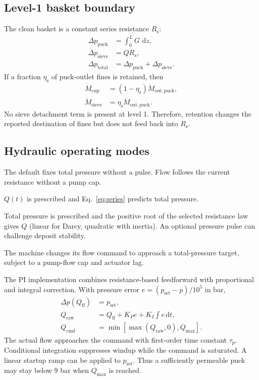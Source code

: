 \documentclass[11pt,a4paper]{article}
\newcommand{\dd}{\,\mathrm d}
\begin{document}
\subsection{Level-1 basket boundary}

The clean basket is a constant series resistance $R_{\mathrm s}$:
\begin{align}
\Delta p_{\mathrm{puck}}&=\displaystyle\int_0^LG\,\dd z,\\
\Delta p_{\mathrm{sieve}}&=Q R_{\mathrm s},\\
\Delta p_{\mathrm{total}}&=\Delta p_{\mathrm{puck}}+\Delta p_{\mathrm{sieve}}.
\label{eq:series}
\end{align}
If a fraction $\eta_{\mathrm s}$ of puck-outlet fines is retained, then
\begin{align}
\dot M_{\mathrm{cup}}&=(1-\eta_{\mathrm s})\dot M_{\mathrm{out,puck}},\\
\dot M_{\mathrm{sieve}}&=\eta_{\mathrm s}\dot M_{\mathrm{out,puck}}.
\end{align}
No sieve detachment term is present at level 1. Therefore, retention changes the
reported destination of fines but does not feed back into $R_{\mathrm s}$.

\subsection{Hydraulic operating modes}

\begin{description}[style=nextline,leftmargin=2.6cm]
\item[Constant mode] The default fixes total pressure without a pulse. Flow follows the current resistance without a pump cap.
\item[Flow mode] $Q(t)$ is prescribed and Eq.~\eqref{eq:series} predicts total pressure.
\item[Pressure mode] Total pressure is prescribed and the positive root of the
selected resistance law gives $Q$ (linear for Darcy, quadratic with inertia). An optional pressure pulse can
challenge deposit stability.
\item[PI mode] The machine changes its flow command to approach a total-pressure target, subject to a pump-flow cap and actuator lag.
\end{description}

The PI implementation combines resistance-based feedforward with proportional
and integral correction. With pressure error $e=(p_{\mathrm{set}}-p)/10^5$ in bar,
\begin{align}
\Delta p(Q_{\mathrm{ff}})&=p_{\mathrm{set}},\\
Q_{\mathrm{raw}}&=Q_{\mathrm{ff}}+K_Pe+K_I\int e\dd t,\\
Q_{\mathrm{cmd}}&=\min\!\left[\max(Q_{\mathrm{raw}},0),Q_{\max}\right].
\end{align}
The actual flow approaches the command with first-order time constant $\tau_p$.
Conditional integration suppresses windup while the command is saturated. A
linear startup ramp can be applied to $p_{\mathrm{set}}$. Thus a sufficiently
permeable puck may stay below 9 bar when $Q_{\max}$ is reached.
\end{document}
